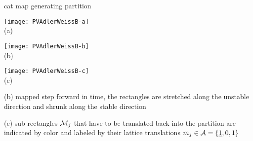 \begin{frame}{cat map generating partition}
\begin{center}
            \begin{minipage}[c]{0.23\textwidth}\begin{center}
\texttt{[image: PVAdlerWeissB-a]}\\(a)
            \end{center}\end{minipage}
            \begin{minipage}[c]{0.23\textwidth}\begin{center}
\texttt{[image: PVAdlerWeissB-b]}\\(b)
            \end{center}\end{minipage}
            \begin{minipage}[c]{0.23\textwidth}\begin{center}
\texttt{[image: PVAdlerWeissB-c]}\\(c)
            \end{center}\end{minipage}
\end{center}
(b)
mapped step forward in time, the rectangles are stretched along the
unstable direction and shrunk along the stable direction

(c) sub-rectangles
$\mathcal{M}_j$ that have to be translated back into the partition are indicated by
color and labeled by their lattice translations
${m_{j}}\in\mathcal{A}=\{\underline{1},0,1\}$
\end{frame}

